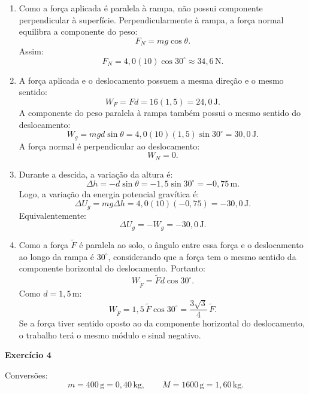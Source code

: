 \documentclass[12pt]{article}
\begin{document}
	\begin{enumerate}[label=\textbf{\alph*)}]
		\item Como a força aplicada é paralela à rampa, não possui componente perpendicular
		à superfície. Perpendicularmente à rampa, a força normal equilibra a componente do
		peso:
		\[
		F_N=mg\cos\theta.
		\]
		Assim:
		\[
		F_N=4,0(10)\cos30^\circ
		\approx34,6\,\text{N}.
		\]

		\item A força aplicada e o deslocamento possuem a mesma direção e o mesmo sentido:
		\[
		W_F=Fd
		=16(1,5)
		=24,0\,\text{J}.
		\]
		A componente do peso paralela à rampa também possui o mesmo sentido do deslocamento:
		\[
		W_g=mgd\sin\theta
		=4,0(10)(1,5)\sin30^\circ
		=30,0\,\text{J}.
		\]
		A força normal é perpendicular ao deslocamento:
		\[
		W_N=0.
		\]

		\item Durante a descida, a variação da altura é:
		\[
		\Delta h=-d\sin\theta
		=-1,5\sin30^\circ
		=-0,75\,\text{m}.
		\]
		Logo, a variação da energia potencial gravítica é:
		\[
		\Delta U_g=mg\Delta h
		=4,0(10)(-0,75)
		=-30,0\,\text{J}.
		\]
		Equivalentemente:
		\[
		\Delta U_g=-W_g=-30,0\,\text{J}.
		\]

		\item Como a força $\tilde{F}$ é paralela ao solo, o ângulo entre essa força e o
		deslocamento ao longo da rampa é $30^\circ$, considerando que a força tem o mesmo
		sentido da componente horizontal do deslocamento. Portanto:
		\[
		W_{\tilde{F}}=\tilde{F}d\cos30^\circ.
		\]
		Como $d=1,5\,\text{m}$:
		\[
		W_{\tilde{F}}
		=1,5\,\tilde{F}\cos30^\circ
		=\frac{3\sqrt{3}}{4}\,\tilde{F}.
		\]
		Se a força tiver sentido oposto ao da componente horizontal do deslocamento, o
		trabalho terá o mesmo módulo e sinal negativo.
	\end{enumerate}

	\vspace{0.2cm}

	\textbf{Exercício 4}

	Conversões:
	\[
	m=400\,\text{g}=0,40\,\text{kg},
	\qquad
	M=1600\,\text{g}=1,60\,\text{kg}.
	\]
\end{document}
